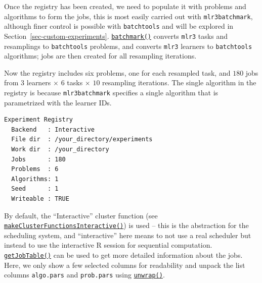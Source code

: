 Once the registry has been created, we need to populate it with problems
and algorithms to form the jobs, this is most easily carried out with
\texttt{mlr3batchmark}, although finer
control is possible with \texttt{batchtools} and will be explored in
Section~\ref{sec-custom-experiments}.
\href{https://mlr3batchmark.mlr-org.com/reference/batchmark.html}{\texttt{batchmark()}}
converts \texttt{mlr3} tasks and resamplings to \texttt{batchtools}
problems, and converts \texttt{mlr3} learners to \texttt{batchtools}
algorithms; jobs are then created for all resampling iterations.

\begin{Shaded}
\begin{Highlighting}[]
\end{Highlighting}
\end{Shaded}

Now the registry includes six problems, one for each resampled task, and
\(180\) jobs from \(3\) learners \(\times\) \(6\) tasks \(\times\)
\(10\) resampling iterations. The single algorithm in the registry is
because \texttt{mlr3batchmark} specifies a single algorithm that is
parametrized with the learner IDs.

\begin{Shaded}
\begin{Highlighting}[]
\end{Highlighting}
\end{Shaded}

\begin{verbatim}
Experiment Registry
  Backend   : Interactive
  File dir  : /your_directory/experiments
  Work dir  : /your_directory
  Jobs      : 180
  Problems  : 6
  Algorithms: 1
  Seed      : 1
  Writeable : TRUE
\end{verbatim}

By default, the ``Interactive'' cluster function (see
\href{https://www.rdocumentation.org/packages/batchtools/topics/makeClusterFunctionsInteractive}{\texttt{makeClusterFunctionsInteractive()}})
is used -- this is the abstraction for the scheduling system, and
``interactive'' here means to not use a real scheduler but instead to
use the interactive R session for sequential computation.
\href{https://www.rdocumentation.org/packages/batchtools/topics/getJobTable}{\texttt{getJobTable()}}
can be used to get more detailed information about the jobs. Here, we
only show a few selected columns for readability and unpack the list
columns \texttt{algo.pars} and \texttt{prob.pars} using
\href{https://www.rdocumentation.org/packages/batchtools/topics/unwrap}{\texttt{unwrap()}}.


